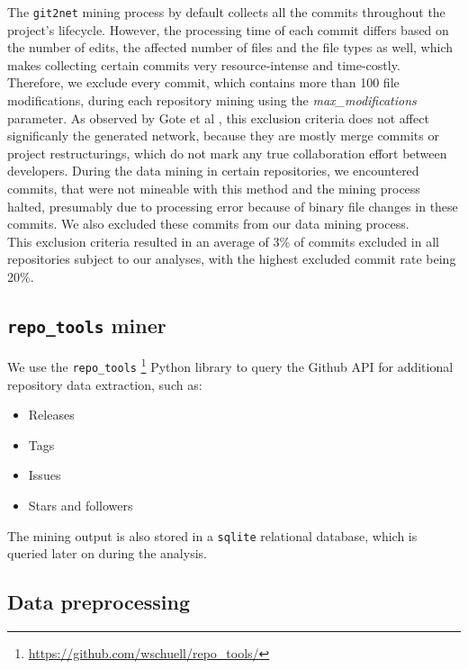 The \texttt{git2net} mining process by default collects all the commits throughout the project's lifecycle. However, the processing time of each commit differs based on the number of edits, the affected number of files and the file types as well, which makes collecting certain commits very resource-intense and time-costly. Therefore, we exclude every commit, which contains more than 100 file modifications, during each repository mining using the \textit{max\_modifications} parameter. As observed by Gote et al \cite{goteAnalysingTimeStampedCoEditing2019}, this exclusion criteria does not affect significanly the generated network, because they are mostly merge commits or project restructurings, which do not mark any true collaboration effort between developers. During the data mining in certain repositories, we encountered commits, that were not mineable with this method and the mining process halted, presumably due to processing error because of binary file changes in these commits. We also excluded these commits from our data mining process.\\

This exclusion criteria resulted in an average of 3\% of commits excluded in all repositories subject to our analyses, with the highest excluded commit rate being 20\%.

\subsection{\texttt{repo\_tools} miner} 

We use the \texttt{repo\_tools} \footnote{\url{https://github.com/wschuell/repo\_tools/}} Python library to query the Github API for additional repository data extraction, such as:

\begin{itemize}
    \item Releases
    \item Tags
    \item Issues
    \item Stars and followers
\end{itemize}

The mining output is also stored in a \texttt{sqlite} relational database, which is queried later on during the analysis. 


\subsection{Data preprocessing}

